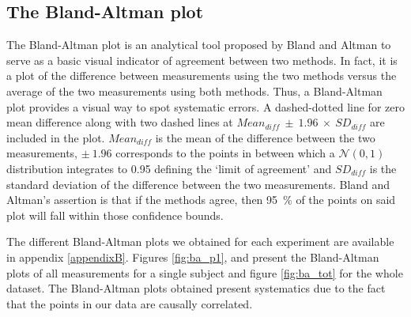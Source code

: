 \subsection{\label{sec:ba}The Bland-Altman plot}
The Bland-Altman plot is an analytical tool proposed by Bland and Altman \cite{altman1983measurement, martin1986statistical} to serve as a basic visual indicator of agreement between two methods. In fact, it is a plot of the difference between measurements using the two methods versus the average of the two measurements using both methods. Thus, a Bland-Altman plot provides a visual way to spot systematic errors. A dashed-dotted line for zero mean difference along with two dashed lines at $Mean_{diff}~\pm~1.96~\times~SD_{diff}$ are included in the plot. $Mean_{diff}$ is the mean of the difference between the two measurements, $\pm~1.96$ corresponds to the points in between which a $\mathcal{N}(0,1)$ distribution integrates to 0.95 defining the `limit of agreement' and $SD_{diff}$ is the standard deviation of the difference between the two measurements. Bland and Altman's assertion is that if the methods agree, then 95~\% of the points on said plot will fall within those confidence bounds.

The different Bland-Altman plots we obtained for each experiment are available in appendix \ref{appendixB}. Figures \ref{fig:ba_p1},  and  present the Bland-Altman plots of all measurements for a single subject and figure \ref{fig:ba_tot} for the whole dataset. The Bland-Altman plots obtained present systematics due to the fact that the points in our data are causally correlated.

